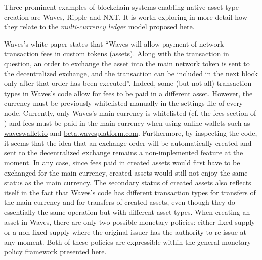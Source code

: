 \documentclass{llncs}
\begin{document}
Three prominent examples of blockchain systems enabling native asset type creation are Waves, Ripple and NXT. It is worth exploring in more detail how they relate to the \emph{multi-currency ledger} model proposed here. 

Waves's white paper \cite{Waves} states that ``Waves will allow payment of network transaction fees in custom tokens (assets). Along with the transaction in question, an order to exchange the asset into the main network token is sent to the decentralized exchange, and the transaction can be included in the next block only after that order has been executed''. Indeed, some (but not all) transaction types in Waves's code allow for fees to be paid in a different asset. However, the currency must be previously whitelisted manually in the settings file of every node. Currently, only Waves's main currency is whitelisted (cf. the fees section of \cite{WavesCodeApplicationConf}) and fees must be paid in the main currency when using online wallets such as \url{waveswallet.io} and \url{beta.wavesplatform.com}. Furthermore, by inspecting the code, it seems that the idea that an exchange order will be automatically created and sent to the decentralized exchange remains a non-implemented feature at the moment. In any case, since fees paid in created assets would first have to be exchanged for the main currency, created assets would still not enjoy the same status as the main currency. The secondary status of created assets also reflects itself in the fact that Waves's code has different transaction types for transfers of the main currency and for transfers of created assets, even though they do essentially the same operation but with different asset types. When creating an asset in Waves, there are only two possible monetary policies: either fixed supply or a non-fixed supply where the original issuer has the authority to re-issue at any moment. Both of these policies are expressible within the general monetary policy framework presented here.
\end{document}
